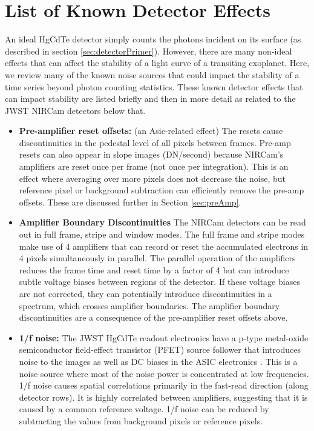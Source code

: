 \documentclass{aastex62}
\begin{document}
\section{List of Known Detector Effects}\label{sec:knownEffects}
An ideal HgCdTe detector simply counts the photons incident on its surface (as described in section \ref{sec:detectorPrimer}).
However, there are many non-ideal effects that can affect the stability of a light curve of a transiting exoplanet.
Here, we review many of the known noise sources that could impact the stability of a time series beyond photon counting statistics. These known detector effects that can impact stability are listed briefly and then in more detail as related to the JWST NIRCam detectors below that.

\begin{itemize}[noitemsep]
	\item \textbf{Pre-amplifier reset offsets:} (an Asic-related effect) 
The resets cause discontinuities in the pedestal level of all pixels between frames.
Pre-amp resets can also appear in slope images (DN/second) because NIRCam's amplifiers are reset once per frame (not once per integration).
This is an effect where averaging over more pixels does not decrease the noise, but reference pixel or background subtraction can efficiently remove the pre-amp offsets.
These are discussed further in Section \ref{sec:preAmp}.
	\item \textbf{Amplifier Boundary Discontinuities} The NIRCam detectors can be read out in full frame, stripe and window modes. The full frame and stripe modes make use of 4 amplifiers that can record or reset the accumulated electrons in 4 pixels simultaneously in parallel. The parallel operation of the amplifiers reduces the frame time and reset time by a factor of 4 but can introduce subtle voltage biases between regions of the detector. If these voltage biases are not corrected, they can potentially introduce discontinuities in a spectrum, which crosses amplifier boundaries.
	The amplifier boundary discontinuities are a consequence of the pre-amplifier reset offsets above.
	\item \textbf{1/f noise:} The JWST HgCdTe readout electronics have a p-type metal-oxide semiconductor field-effect transistor (PFET) source follower that introduces noise to the images as well as DC biases in the ASIC electronics \citep{rauscher2011irsSquared}.
	This is a noise source where most of the noise power is concentrated at low frequencies.
	1/f noise causes spatial correlations primarily in the fast-read direction (along detector rows). It is highly correlated between amplifiers, suggesting that it is caused by a common reference voltage. 1/f noise can be reduced by subtracting the values from background pixels or reference pixels.

\end{itemize}
\end{document}
